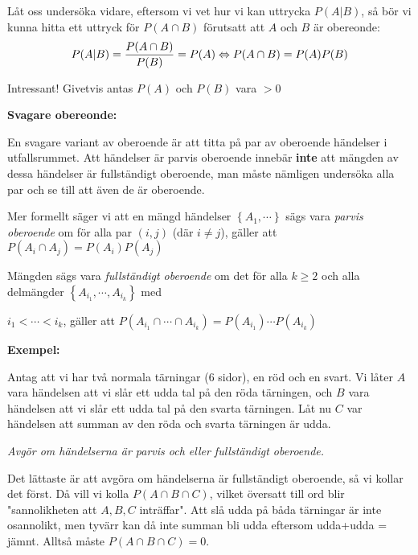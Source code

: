 \par\bigskip
\noindent Låt oss undersöka vidare, eftersom vi vet hur vi kan uttrycka $P(A|B)$, så bör vi kunna hitta ett uttryck för $P(A\cap B)$ förutsatt att $A$ och $B$ är obereonde:
\begin{equation*}
  \begin{gathered}
    P(A|B) = \dfrac{P(A\cap B)}{P(B)} = P(A) \Leftrightarrow P(A\cap B) = P(A)P(B)
  \end{gathered}
\end{equation*}
\par\bigskip
\noindent Intressant! Givetvis antas $P(A)$ och $P(B)$ vara $>0$
\par\bigskip
\noindent\textbf{Svagare obereonde:}\par
\noindent En svagare variant av oberoende är att titta på par av oberoende händelser i utfallsrummet. Att händelser är parvis oberoende innebär \textbf{inte} att mängden av dessa händelser är fullständigt oberoende, man måste nämligen undersöka alla par och se till att även de är oberoende.\par\bigskip
\noindent Mer formellt säger vi att en mängd händelser $\left\{A_1,\cdots\right\}$ sägs vara \textit{parvis oberoende} om för alla par $(i,j)$ (där $i\neq j $), gäller att $P(A_i\cap A_j)=P(A_i)P(A_j)$\par
\noindent Mängden sägs vara \textit{fullständigt oberoende} om det för alla $k\geq2$ och alla delmängder $\left\{A_{i_1},\cdots, A_{i_k}\right\}$ med\par\noindent $i_1<\cdots<i_k$, gäller att $P(A_{i_1}\cap\cdots\cap A_{i_k}) = P(A_{i_1})\cdots P(A_{i_k})$
\par\bigskip
\noindent\textbf{Exempel:}\par
\noindent Antag att vi har två normala tärningar (6 sidor), en röd och en svart. Vi låter $A$ vara händelsen att vi slår ett udda tal på den röda tärningen, och $B$ vara händelsen att vi slår ett udda tal på den svarta tärningen. Låt nu $C$ var händelsen att summan av den röda och svarta tärningen är udda.\par
\noindent\textit{Avgör om händelserna är parvis och eller fullständigt oberoende.}
\par\bigskip
\noindent Det lättaste är att avgöra om händelserna är fullständigt oberoende, så vi kollar det först. Då vill vi kolla $P(A\cap B\cap C)$, vilket översatt till ord blir "sannolikheten att $A,B,C$ inträffar". Att slå udda på båda tärningar är inte osannolikt, men tyvärr kan då inte summan bli udda eftersom udda+udda = jämnt. Alltså måste $P(A\cap B\cap C) = 0$.\par
